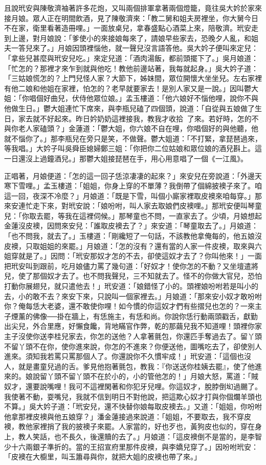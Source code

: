 且說玳安與陳敬濟袖著許多花炮，又叫兩個排軍拿著兩個燈籠，竟往吳大妗於家來接月娘。眾人正在明間飲酒，見了陳敬濟來：「教二舅和姐夫房裡坐，你大舅今日不在家，衛里看著造冊哩。」一面放桌兒，拿春盛點心酒菜上來，陪敬濟。玳安走到上邊，對月娘說：「爹使小的來接娘每來了，請娘早些家去，恐晚夕人亂，和姐夫一答兒來了。」月娘因頭裡惱他，就一聲兒沒言語答他。吳大妗子便叫來定兒：「拿些兒甚麼與玳安兒吃。」來定兒道：「酒肉湯飯，都前頭擺下了。」吳月娘道：「忙怎的？那裡才來乍到就與他吃！教他前邊站著，我每就起身。」吳大妗子道：「三姑娘慌怎的？上門兒怪人家？大節下，姊妹間，眾位開懷大坐坐兒。左右家裡有他二娘和他姐在家裡，怕怎的？老早就要家去！是別人家又是一說。」因叫鬱大姐：「你唱個好曲兒，伏侍他眾位娘。」孟玉樓道：「他六娘好不惱他哩，說你不與他做生日。」鬱大姐連忙下席來，與李瓶兒磕了四個頭，說道：「自從與五娘做了生日，家去就不好起來。昨日妗奶奶這裡接我，教我才收拾了來。若好時，怎的不與你老人家磕頭？」金蓮道：「鬱大姐，你六娘不自在哩，你唱個好的與他聽，他就不惱你了。」那李瓶兒在旁只是笑，不做聲。鬱大姐道：「不打緊，拿琵琶過來，等我唱。」大妗子叫吳舜臣媳婦鄭三姐：「你把你二位姑娘和眾位娘的酒兒斟上。這一日還沒上過鐘酒兒。」那鬱大姐接琵琶在手，用心用意唱了一個《一江風》。

正唱著，月娘便道：「怎的這一回子恁涼凄凄的起來？」來安兒在旁說道：「外邊天寒下雪哩。」孟玉樓道：「姐姐，你身上穿的不單薄？我倒帶了個綿披襖子來了。咱這一回，夜深不冷麼？」月娘道：「既是下雪，叫個小廝家裡取皮襖來咱每穿。」那來安連忙走下來，對玳安說：「娘吩咐，叫人家去取娘們皮襖哩。」那玳安便叫琴童兒：「你取去罷，等我在這裡伺候。」那琴童也不問，一直家去了。少頃，月娘想起金蓮沒皮襖，因問來安兒：「誰取皮襖去了？」來安道：「琴童取去了。」月娘道：「也不問我，就去了。」玉樓道：「剛纔短了一句話，不該教他拿俺每的，他五娘沒皮襖，只取姐姐的來罷。」月娘道：「怎的沒有？還有當的人家一件皮襖，取來與六姐穿就是了。」因問：「玳安那奴才怎的不去，卻使這奴才去了？你叫他來！」一面把玳安叫到跟前，吃月娘儘力罵了幾句道：「好奴才！使你怎的不動？又坐壇遣將兒，使了那個奴才去了。也不問我聲兒，三不知就去了。怪不的你做大官兒，恐怕打動你展翅兒，就只遣他去！」玳安道：「娘錯怪了小的。頭裡娘吩咐若是叫小的去，小的敢不去？來安下來，只說叫一個家裡去。」月娘道：「那來安小奴才敢吩咐你？俺每恁大老婆，還不敢使你哩！如今慣的你這奴才們有些摺兒也怎的？一來主子煙薰的佛像──掛在牆上，有恁施主，有恁和尚。你說你恁行動兩頭戳舌，獻勤出尖兒，外合里應，好懶食饞，背地瞞官作弊，乾的那繭兒我不知道哩！頭裡你家主子沒使你送李桂兒家去，你怎的送他？人拿著氈包，你還匹手奪過去了。留丫頭不留丫頭不在你，使你進來說，你怎的不進來？你便送他，圖嘴吃去了，卻使別人進來。須知我若罵只罵那個人了。你還說你不久慣牢成！」玳安道：「這個也沒人，就是畫童兒過的舌。爹見他抱著氈包，教我：『你送送你桂姨去罷』，使了他進來的。娘說留丫頭不留丫頭不在於小的，小的管他怎的！」月娘大怒，罵道：「賊奴才，還要說嘴哩！我可不這裡閑著和你犯牙兒哩。你這奴才，脫脖倒㘭過颺了。我使著不動，耍嘴兒，我就不信到明日不對他說，把這欺心奴才打與你個爛羊頭也不算。」吳大妗子道：「玳安兒，還不快替你娘每取皮襖去。」又道：「姐姐，你吩咐他拿那裡皮襖與他五娘穿？」潘金蓮接過來說道：「姐姐，不要取去，我不穿皮襖，教他家裡捎了我的披襖子來罷。人家當的，好也歹也，黃狗皮也似的，穿在身上，教人笑話，也不長久，後還贖的去了。」月娘道：「這皮襖倒不是當的，是李智少十六兩銀子準折的。當的王招宣府里那件皮襖，與李嬌兒穿了。」因吩咐玳安：「皮襖在大櫥里，叫玉簫尋與你，就把大姐的皮襖也帶了來。」

